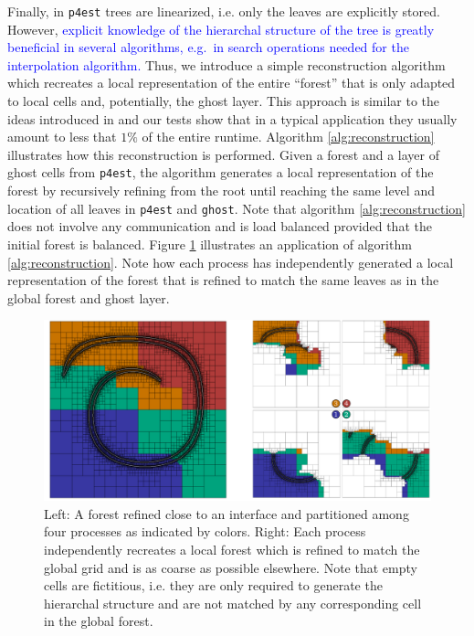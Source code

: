 Finally, in \texttt{p4est} trees are linearized, i.e. only the leaves are explicitly stored. However, \textcolor{blue}{explicit knowledge of the hierarchal structure of the tree is greatly beneficial in several algorithms, e.g.\ in search operations needed for the interpolation algorithm.} Thus, we introduce a simple reconstruction algorithm which recreates a local representation of the entire ``forest'' that is only adapted to local cells and, potentially, the ghost layer. This approach is similar to the ideas introduced in \cite{Bangerth;Burstedde;Heister;etal:11:Algorithms-and-data-} and our tests show that in a typical application they usually amount to less that $1\%$ of the entire runtime. Algorithm \ref{alg:reconstruction} illustrates how this reconstruction is performed. Given a forest and a layer of ghost cells from \texttt{p4est}, the algorithm generates a local representation of the forest by recursively refining from the root until reaching the same level and location of all leaves in \texttt{p4est} and \texttt{ghost}. Note that algorithm \ref{alg:reconstruction} does not involve any communication and is load balanced provided that the initial forest is balanced. Figure \ref{fig:reconstruction} illustrates an application of algorithm \ref{alg:reconstruction}. Note how each process has independently generated a local representation of the forest that is refined to match the same leaves as in the global forest and ghost layer.
\begin{figure}[htbp]
\begin{center}
\includegraphics[width = \textwidth]{figures/reconstruct.pdf}
\end{center}
\caption{Left: A forest refined close to an interface and partitioned among four processes as indicated by colors. Right: Each process independently recreates a local forest which is refined to match the global grid and is as coarse as possible elsewhere. Note that empty cells are fictitious, i.e. they are only required to generate the hierarchal structure and are not matched by any corresponding cell in the global forest.}
\label{fig:reconstruction}
\end{figure}
